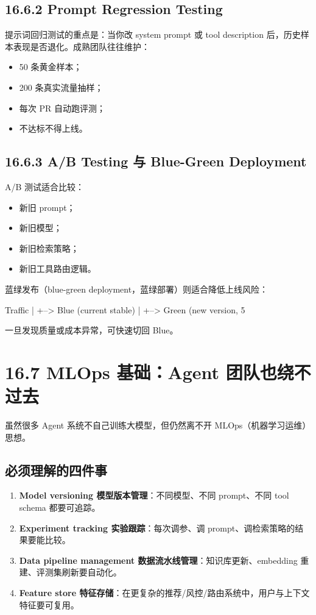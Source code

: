 \subsection{16.6.2 Prompt Regression Testing}

提示词回归测试的重点是：当你改 system prompt 或 tool description 后，历史样本表现是否退化。成熟团队往往维护：


\begin{itemize}[leftmargin=2em]
\item 50 条黄金样本；
\item 200 条真实流量抽样；
\item 每次 PR 自动跑评测；
\item 不达标不得上线。
\end{itemize}

\subsection{16.6.3 A/B Testing 与 Blue-Green Deployment}

A/B 测试适合比较：


\begin{itemize}[leftmargin=2em]
\item 新旧 prompt；
\item 新旧模型；
\item 新旧检索策略；
\item 新旧工具路由逻辑。
\end{itemize}

蓝绿发布（blue-green deployment，蓝绿部署）则适合降低上线风险：


\begin{codeblock}
Traffic
  |
  +--> Blue (current stable)
  |
  +--> Green (new version, 5%
\end{codeblock}

一旦发现质量或成本异常，可快速切回 Blue。


\section{16.7 MLOps 基础：Agent 团队也绕不过去}

虽然很多 Agent 系统不自己训练大模型，但仍然离不开 MLOps（机器学习运维）思想。


\subsection{必须理解的四件事}

\begin{enumerate}[leftmargin=2em]
\item \textbf{Model versioning 模型版本管理}：不同模型、不同 prompt、不同 tool schema 都要可追踪。
\item \textbf{Experiment tracking 实验跟踪}：每次调参、调 prompt、调检索策略的结果要能比较。
\item \textbf{Data pipeline management 数据流水线管理}：知识库更新、embedding 重建、评测集刷新要自动化。
\item \textbf{Feature store 特征存储}：在更复杂的推荐/风控/路由系统中，用户与上下文特征要可复用。
\end{enumerate}

